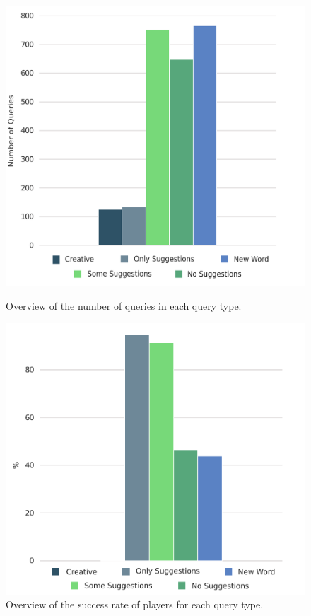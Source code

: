 \begin{figure}[ht!]
    \vspace*{-.4cm}
    \begin{minipage}[b][][b]{0.45\textwidth}
    \includegraphics[width=1.0\textwidth]{graphics/evaluation/five_query_categories.pdf}
    \caption{Overview of the number of queries in each query type.}
    \label{fig:querytypes}
    \end{minipage}
    \hfill
    \begin{minipage}[b][][b]{0.45\textwidth}
    \includegraphics[width=1.0\textwidth]{graphics/evaluation/five_query_categories_success_rate.pdf}
    \caption{Overview of the success rate of players for each query type.}
    \label{fig:queries:success}
    \end{minipage}
\end{figure}


